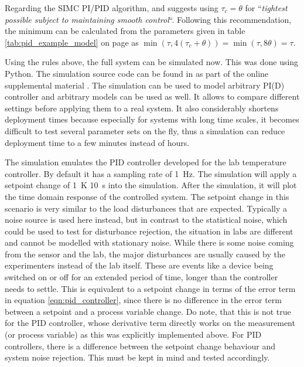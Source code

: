 Regarding the SIMC PI/PID algorithm, \citeauthor{simc_paper} \cite{simc_paper} and \citep[ch. 5]{simc} suggests using $\tau_c = \theta$ for “\textit{tightest possible subject to maintaining smooth control}“. Following this recommendation, the minimum can be calculated from the parameters given in table \ref{tab:pid_example_model} on page \pageref{tab:pid_example_model} as $\min\left(\tau, 4 (\tau_c+\theta)\right) = \min\left(\tau, 8 \theta\right) = \tau$.

Using the rules above, the full system can be simulated now. This was done using Python. The simulation source code can be found in  as part of the online supplemental material \cite{supplemental_material}. The simulation can be used to model arbitrary PI(D) controller and arbitrary models can be used as well. It allows to compare different settings before applying them to a real system. It also considerably shortens deployment times because especially for systems with long time scales, it becomes difficult to test several parameter sets on the fly, thus a simulation can reduce deployment time to a few minutes instead of hours.

The simulation emulates the PID controller developed for the lab temperature controller. By default it has a sampling rate of \qty{1}{\Hz}. The simulation  will apply a setpoint change of \qty{+1}{\K} \qty{10}{\s} into the simulation. After the simulation, it will plot the time domain response of the controlled system. The setpoint change in this scenario is very similar to the load disturbances that are expected. Typically a noise source is used here instead, but in contrast to the statistical noise, which could be used to test for disturbance rejection, the situation in labs are different and cannot be modelled with stationary noise. While there is some noise coming from the sensor and the lab, the major disturbances are usually caused by the experimenters instead of the lab itself. These are events like a device being switched on or off for an extended period of time, longer than the controller needs to settle. This is equivalent to a setpoint change in terms of the error term in equation \ref{eqn:pid_controller}, since there is no difference in the error term between a setpoint and a process variable change. Do note, that this is not true for the PID controller, whose derivative term directly works on the measurement (or process variable) as this was explicitly implemented above. For PID controllers, there is a difference between the setpoint change behaviour and system noise rejection. This must be kept in mind and tested accordingly.

